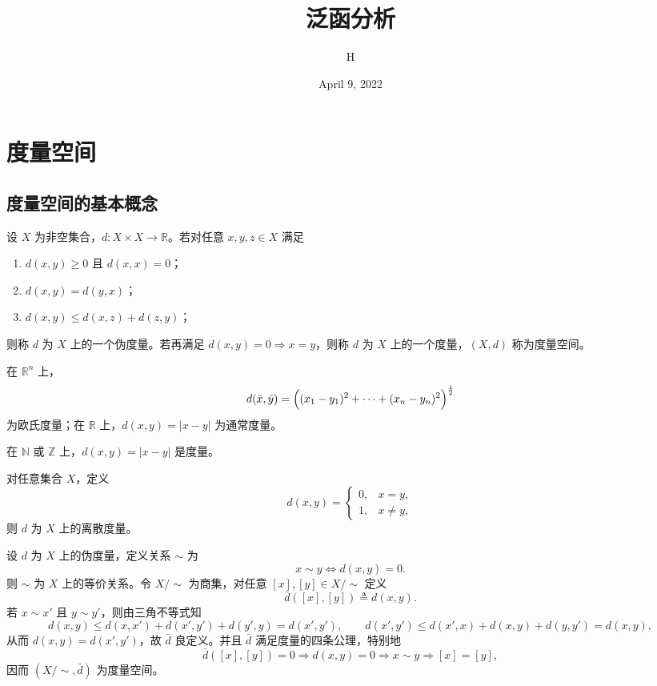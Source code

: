 \documentclass[lang=cn,a4paper,newtx,section]{elegantbook}
\title{泛函分析}
\author{H}
\date{April 9, 2022}
\begin{document}
\maketitle
\frontmatter

\tableofcontents

\mainmatter

\chapter{度量空间}

\section{度量空间的基本概念}

\begin{definition}
  设 $X$ 为非空集合，$d: X \times X \to \mathbb{R}$。若对任意 $x,y,z \in X$ 满足
  \begin{enumerate}
    \item $d(x,y) \ge 0$ 且 $d(x,x)=0$；
    \item $d(x,y)=d(y,x)$；
    \item $d(x,y) \le d(x,z)+d(z,y)$；
  \end{enumerate}
  则称 $d$ 为 $X$ 上的一个伪度量。若再满足 $d(x,y)=0 \Rightarrow x=y$，则称 $d$ 为 $X$ 上的一个度量，$(X,d)$ 称为度量空间。
\end{definition}
\begin{example}
  在 $\mathbb{R}^n$ 上，
  \[
    d(\bar{x},\bar{y})=\Bigl((x_1-y_1)^2+\cdots+(x_n-y_n)^2\Bigr)^{\frac12}
  \]
  为欧氏度量；在 $\mathbb{R}$ 上，$d(x,y)=|x-y|$ 为通常度量。
\end{example}

\begin{example}
  在 $\mathbb{N}$ 或 $\mathbb{Z}$ 上，$d(x,y)=|x-y|$ 是度量。
\end{example}

\begin{example}
  对任意集合 $X$，定义
  \[
    d(x,y)=\begin{cases}
      0, & x=y,\\
      1, & x \ne y,
    \end{cases}
  \]
  则 $d$ 为 $X$ 上的离散度量。
\end{example}
\begin{remark}
  设 $d$ 为 $X$ 上的伪度量，定义关系 $\sim$ 为
  \[
    x\sim y \iff d(x,y)=0.
  \]
  则 $\sim$ 为 $X$ 上的等价关系。令 $X/\!\sim$ 为商集，对任意 $[x],[y]\in X/\!\sim$ 定义
  \[
    \bar d([x],[y])\triangleq d(x,y).
  \]
  若 $x\sim x'$ 且 $y\sim y'$，则由三角不等式知
  \[
    d(x,y)\le d(x,x')+d(x',y')+d(y',y)=d(x',y'),\qquad
    d(x',y')\le d(x',x)+d(x,y)+d(y,y')=d(x,y),
  \]
  从而 $d(x,y)=d(x',y')$，故 $\bar d$ 良定义。并且 $\bar d$ 满足度量的四条公理，特别地
  \[
    \bar d([x],[y])=0 \Rightarrow d(x,y)=0 \Rightarrow x\sim y \Rightarrow [x]=[y],
  \]
  因而 $(X/\!\sim,\bar d)$ 为度量空间。
\end{remark}
\end{document}
